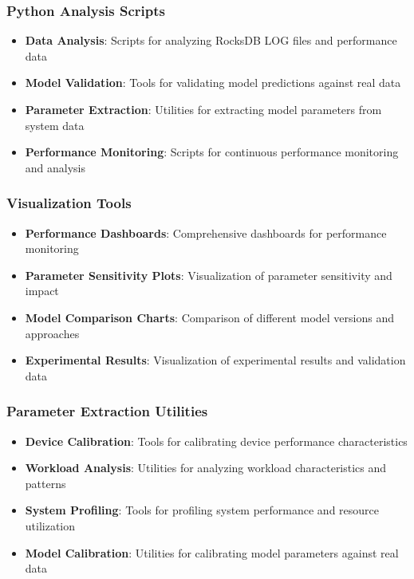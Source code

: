 \documentclass[11pt]{article}
\begin{document}
\subsubsection{Python Analysis Scripts}
\begin{itemize}
    \item \textbf{Data Analysis}: Scripts for analyzing RocksDB LOG files and performance data
    \item \textbf{Model Validation}: Tools for validating model predictions against real data
    \item \textbf{Parameter Extraction}: Utilities for extracting model parameters from system data
    \item \textbf{Performance Monitoring}: Scripts for continuous performance monitoring and analysis
\end{itemize}

\subsubsection{Visualization Tools}
\begin{itemize}
    \item \textbf{Performance Dashboards}: Comprehensive dashboards for performance monitoring
    \item \textbf{Parameter Sensitivity Plots}: Visualization of parameter sensitivity and impact
    \item \textbf{Model Comparison Charts}: Comparison of different model versions and approaches
    \item \textbf{Experimental Results}: Visualization of experimental results and validation data
\end{itemize}

\subsubsection{Parameter Extraction Utilities}
\begin{itemize}
    \item \textbf{Device Calibration}: Tools for calibrating device performance characteristics
    \item \textbf{Workload Analysis}: Utilities for analyzing workload characteristics and patterns
    \item \textbf{System Profiling}: Tools for profiling system performance and resource utilization
    \item \textbf{Model Calibration}: Utilities for calibrating model parameters against real data
\end{itemize}
\end{document}
